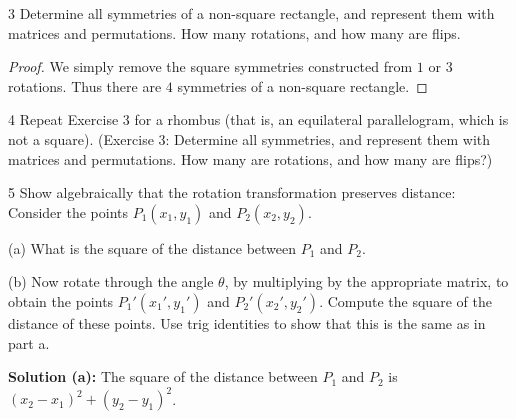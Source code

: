\begin{problem}{3}
    Determine all symmetries of a non-square rectangle,
    and represent them with matrices and permutations.
    How many rotations, and how many are flips.
\end{problem}
\solved

\begin{proof}
    We simply remove the square symmetries constructed from $1$ or $3$ rotations.
    Thus there are $4$ symmetries of a non-square rectangle.
\end{proof}

\begin{problem}{4}
    Repeat Exercise 3 for a rhombus (that is, an equilateral parallelogram, which is not a
    square). (Exercise 3: Determine all symmetries, and represent them with matrices and
    permutations. How many are rotations, and how many are flips?)
\end{problem}
\unsolved

\begin{problem}{5}
    Show algebraically that the rotation transformation 
    preserves distance: Consider the points 
    $P_1(x_1, y_1)$ and $P_2(x_2, y_2)$.

    (a) What is the square of the distance between $P_1$
        and $P_2$.

    (b) Now rotate through the angle $\theta$, by multiplying 
        by the appropriate matrix, to obtain the points 
        $P_1'(x_1', y_1')$ and $P_2'(x_2', y_2')$.
        Compute the square of the distance of these points.
        Use trig identities to show that this is the same 
        as in part a.
\end{problem}
\solved

\textbf{Solution (a):}
The square of the distance between $P_1$ and $P_2$ is  
    $(x_2 - x_1)^2 + (y_2 - y_1)^2$.

